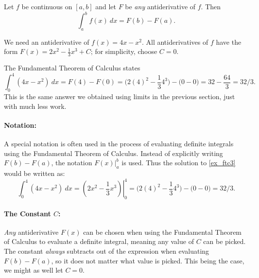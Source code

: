 {Let $f$ be continuous on $[a,b]$ and let $F$ be \textit{any} antiderivative of $f$. Then $$\int_a^b f(x)\ dx = F(b) - F(a).$$}


{We need an antiderivative of $f(x)=4x-x^2$. All antiderivatives of $f$ have the form $F(x) = 2x^2-\frac13x^3+C$; for simplicity, choose $C=0$.

The Fundamental Theorem of Calculus states
\[
\int_0^4(4x-x^2)\ dx = F(4)-F(0)
= \big(2(4)^2-\frac134^3\big)-\big(0-0\big) = 32-\frac{64}3 = 32/3.
\]
This is the same answer we obtained using limits in the previous section, just with much less work.}

\paragraph{Notation:}
A special notation is often used in the process of evaluating definite integrals using the Fundamental Theorem of Calculus. Instead of explicitly writing $F(b)-F(a)$, the notation $F(x)\Big|_a^b$ is used. Thus the solution to \autoref{ex_ftc3} would be written as:
\[
\int_0^4(4x-x^2)\ dx = \left.\left(2x^2-\frac13x^3\right)\right|_0^4
= \big(2(4)^2-\frac134^3\big)-\big(0-0\big) =  32/3.
\]

\paragraph{The Constant $C$:} \textit{Any} antiderivative $F(x)$ can be chosen when using the Fundamental Theorem of Calculus to evaluate a definite integral, meaning any value of $C$ can be picked. The constant \textit{always} subtracts out of the expression when evaluating $F(b)-F(a)$, so it does not matter what value is picked. This being the case, we might as well let $C=0$.\\

